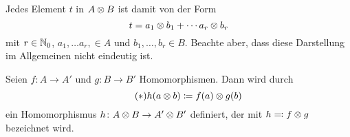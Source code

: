 
\begin{kommentar}
    Jedes Element $t$ in $A \otimes B$ ist damit von der Form
    \begin{equation*}
      t = a_1 \otimes b_1 + \dotsb a_r \otimes b_r
    \end{equation*}
    mit $r \in \mathbb{N}_0$, $a_1, \dotsc a_r, \in A$ und $b_1, \dotsc, b_r \in B$.
    Beachte aber, dass diese Darstellung im Allgemeinen nicht eindeutig ist.
\end{kommentar}

\begin{defn}
  Seien $f \colon A \to A'$ und $g \colon B \to B'$ Homomorphismen.
  Dann wird durch
  \begin{equation*}
    \label{eqn:tensor_hom}
    \tag{$\ast$}
    h(a \otimes b) \coloneqq f(a) \otimes g(b)
  \end{equation*}
  ein Homomorphismus $h \colon A \otimes B \to A' \otimes B'$ definiert, der mit $h \eqqcolon f \otimes g$ bezeichnet wird.
\end{defn}

